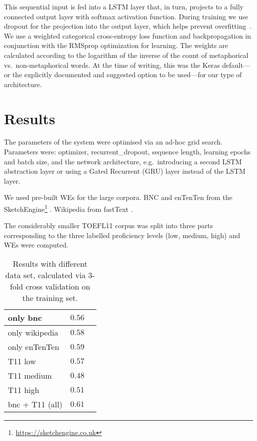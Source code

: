 \documentclass[11pt,a4paper]{article}
\begin{document}
This sequential input is fed into a LSTM layer that, in turn, projects to a
fully connected output layer with softmax activation function.
During training we use dropout for the projection into the output layer,
which helps prevent overfitting~\cite{Srivastava2014}.
We use a weighted categorical cross-entropy loss function and backpropagation in
conjunction with the RMSprop optimization for learning.  The weights are calculated according to the logarithm of the inverse of the count of metaphorical vs.~non-metaphorical words.
At the time of writing, this was the Keras default---or the explicitly
documented and suggested option to be used---for our type of architecture. 


\section{Results} %
\label{sec:results}

The parameters of the system were optimised via an ad-hoc grid search. Parameters were:
optimizer, recurrent\_dropout, sequence length, learning epochs and batch size, and the network architecture, e.g.~introducing a second LSTM abstraction layer or using a Gated Recurrent (GRU) layer instead of the LSTM layer.

We used pre-built WEs for the large corpora. BNC and enTenTen \cite{1120431}
from the SketchEngine\footnote{\url{https://sketchengine.co.uk}}
\cite{DBLP:journals/corr/BojanowskiGJM16}. Wikipedia from fastText
\cite{mikolov2018advances}. 

The considerably smaller TOEFL11 corpus was split into three parts corresponding to the three labelled proficiency levels (low, medium, high) and WEs were computed.

\begin{table}[h]
\begin{center}
\begin{tabular}{l|r|r}
\hline
only bnc   		& $0.56$ \\ \hline
only wikipedia 	& $0.58$ \\ \hline
only enTenTen	& $0.59$ \\ \hline
\hline
T11 low 		& $0.57$ \\ \hline
T11 medium		& $0.48$ \\ \hline
T11 high		& $0.51$ \\ \hline
\hline
bnc + T11 (all) & $0.61$ \\ \hline
\end{tabular}
\end{center}
\caption{\label{tab:results}Results with different data set, calculated via 3-fold cross validation on the training set.} 
\end{table}
\end{document}
